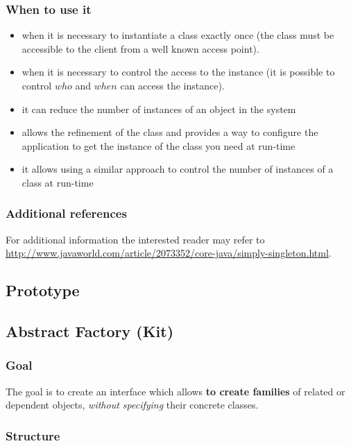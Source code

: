\documentclass{article}
\begin{document}
\subsubsection{When to use it}
\begin{itemize}
\item when it is necessary to instantiate  a class exactly once (the class must be accessible to the client from a well known access point).
\item when it is necessary to control the access to the instance (it is possible to control $who$ and $when$ can access the instance).
\item it can reduce the number of instances of an object in the system
\item allows the refinement of the class and provides a way to configure the application to get the instance of the class you need at run-time
\item it allows using a similar approach to control the number of instances of a class at run-time
\end{itemize}

\subsubsection{Additional references}
For additional information the interested reader may refer to \url{http://www.javaworld.com/article/2073352/core-java/simply-singleton.html}.

\subsection{Prototype}

\subsection{Abstract Factory (Kit)}
\subsubsection{Goal}
The goal is to create an interface which allows \textbf{to create families} of related or dependent objects, \textit{without specifying} their concrete classes. 

\subsubsection{Structure}
\end{document}
